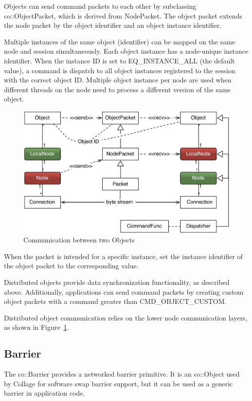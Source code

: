 \documentclass[10pt,a4]{scrartcl}
\newcommand{\fig}[1]{Figure~\ref{#1}}
\begin{document}
Objects can send command packets to each other by subclassing
\textsf{co::Ob\-ject\-Packet}, which is derived from \textsf{NodePacket}. The
object packet extends the node packet by the object identifier and an object
instance identifier.

Multiple instances of the same object (identifier) can be mapped on the same
node and session simultaneously. Each object instance has a node-unique instance
identifier. When the instance ID is set to \textsf{EQ\_INSTANCE\_ALL} (the
default value), a command is dispatch to all object instances registered to the
session with the correct object ID. Multiple object instance per node are used
when different threads on the node need to process a different version of the
same object.

\begin{figure}
  \includegraphics[width=.618\textwidth]{images/netObject.pdf}
  {\caption{\label{fNetObject}Communication between two Objects}}
\end{figure}
When the packet is intended for a specific instance, set the instance identifier
of the object packet to the corresponding value.

Distributed objects provide data synchronization functionality, as described
above. Additionally, applications can send command packets by creating custom
object packets with a command greater than \textsf{CMD\_OBJECT\_CUSTOM}.

Distributed object communication relies on the lower node communication layers,
as shown in \fig{fNetObject}.

\subsection{Barrier}

The \textsf{co::Barrier} provides a networked barrier primitive. It is an
\textsf{co::Object} used by Collage for software swap barrier support, but it
can be used as a generic barrier in application code.
\end{document}
